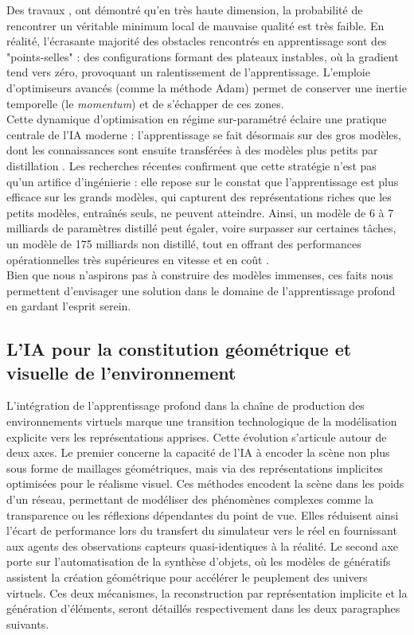 Des travaux  \cite{dauphin_identifying_2014}, \cite{choromanska_loss_2015} ont démontré qu’en très haute dimension, la probabilité de rencontrer un véritable minimum local de mauvaise qualité est très faible. En réalité, l'écrasante majorité des obstacles rencontrés en apprentissage sont des "points-selles" : des configurations formant des plateaux instables, où la gradient tend vers zéro, provoquant un ralentissement de l'apprentissage. L'emploie d'optimiseurs avancés (comme la méthode Adam) permet de conserver une inertie temporelle (le \textit{momentum}) et de s'échapper de ces zones.\\

Cette dynamique d'optimisation en régime sur-paramétré éclaire une pratique centrale de l'IA moderne : l'apprentissage se fait désormais sur des gros modèles, dont les connaissances sont ensuite transférées à des modèles plus petits par distillation \cite{hinton_distilling_2015} . Les recherches récentes confirment que cette stratégie n'est pas qu'un artifice d'ingénierie : elle repose sur le constat que l'apprentissage est plus efficace sur les grands modèles, qui capturent des représentations riches que les petits modèles, entraînés seuls, ne peuvent atteindre. Ainsi, un modèle de 6 à 7 milliards de paramètres distillé peut égaler, voire surpasser sur certaines tâches, un modèle de 175 milliards non distillé, tout en offrant des performances opérationnelles très supérieures en vitesse et en coût \cite{deepseek-ai_deepseek-r1_2025}.\\

Bien que nous n'aspirons pas à construire des modèles immenses, ces faits nous permettent d'envisager une solution dans le domaine de l'apprentissage profond en gardant l'esprit serein.

\subsection{L'IA pour la constitution géométrique et visuelle de l'environnement}

L'intégration de l'apprentissage profond dans la chaîne de production des environnements virtuels marque une transition technologique de la modélisation explicite vers les représentations apprises. Cette évolution s'articule autour de deux axes. Le premier concerne la capacité de l'IA à encoder la scène non plus sous forme de maillages géométriques, mais via des représentations implicites optimisées pour le réalisme visuel. Ces méthodes encodent la scène dans les poids d'un réseau, permettant de modéliser des phénomènes complexes comme la transparence ou les réflexions dépendantes du point de vue. Elles réduisent ainsi l'écart de performance lors du transfert du simulateur vers le réel en fournissant aux agents des observations capteurs quasi-identiques à la réalité. Le second axe porte sur l'automatisation de la synthèse d'objets, où les modèles de génératifs assistent la création géométrique pour accélérer le peuplement des univers virtuels. Ces deux mécanismes, la reconstruction par représentation implicite et la génération d'éléments, seront détaillés respectivement dans les deux paragraphes suivants.


